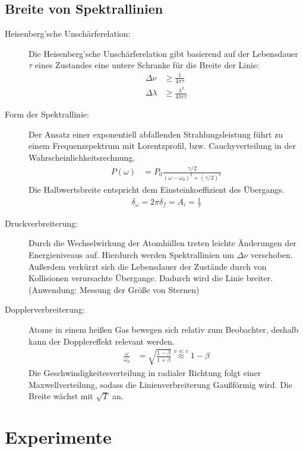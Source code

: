 \documentclass[twocolumn]{summery_4.1}
\begin{document}
\subsection{Breite von Spektrallinien}
\begin{description}
    \item[Heisenberg'sche Unschärferelation:]
    Die Heisenberg'sche Unschärferelation gibt basierend auf der Lebensdauer \(\tau\) eines Zustandes eine untere Schranke für die Breite der Linie:
    \begin{align*}
        \Delta \nu &\ge \frac{1}{4\pi \tau}\\
        \Delta \lambda &\ge \frac{\lambda^2}{4\pi c \tau }
    \end{align*} 
    \item[Form der Spektrallinie:]
    Der Ansatz einer exponentiell abfallenden Strahlungsleistung führt zu einem Frequenzspektrum mit Lorentzprofil, bzw. Cauchyverteilung in der Wahrscheinlichkeitsrechnung.
    \begin{align*}
        P(\omega) &= P_0 \frac{\gamma/2}{(\omega-\omega_0)^2 + (\gamma/2)^2} 
    \end{align*}
    Die Halbwertsbreite entspricht dem Einsteinkoeffizient des Übergangs.
    \begin{align*}
        \delta_\omega = 2\pi \delta_f = A_i = \frac1\tau
    \end{align*}
    \item[Druckverbreiterung:]
    Durch die Wechselwirkung der Atomhüllen treten leichte Änderungen der Energieniveaus auf. Hierdurch werden Spektrallinien um $\Delta \nu$ verschoben. Außerdem verkürzt sich die Lebensdauer der Zustände durch von Kollisionen verursachte Übergange. Dadurch wird die Linie breiter. (Anwendung: Messung der Größe von Sternen)
    \item[Dopplerverbreiterung:]
    Atome in einem heißen Gas bewegen sich relativ zum Beobachter, deshalb kann der Dopplereffekt relevant werden.
    \begin{align*}
        \frac{\omega}{\omega_0} &= \sqrt{\frac{1-\beta}{1+\beta}}
        \overset{v\ll c}\approx 1-\beta 
    \end{align*}
    Die Geschwindigkeitesverteilung in radialer Richtung folgt einer Maxwellverteilung, sodass die Linienverbreiterung Gaußförmig wird.
    Die Breite wächst mit \(\sqrt T\) an.
\end{description}

\section{Experimente}
\end{document}
